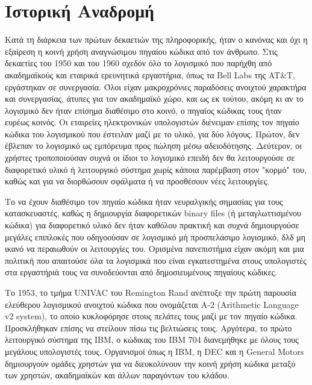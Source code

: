 \documentclass[a4paper, 11pt]{article}
\begin{document}
{\section{Ιστορική Αναδρομή}
Κατά τη διάρκεια των πρώτων δεκαετιών της πληροφορικής, ήταν ο κανόνας και όχι η εξαίρεση η κοινή χρήση αναγνώσιμου πηγαίου κώδικα από τον άνθρωπο. Στις δεκαετίες του 1950 και του 1960 σχεδόν όλο το λογισμικό που παρήχθη από ακαδημαϊκούς και εταιρικά ερευνητικά εργαστήρια, όπως τα \textlatin{Bell Labs} της  \textlatin{AT&T}, εργάστηκαν σε συνεργασία. Όλοι είχαν μακροχρόνιες παραδόσεις ανοιχτού χαρακτήρα και συνεργασίας, άτυπες για τον ακαδημαϊκό χώρο, και ως εκ τούτου, ακόμη κι αν το λογισμικό δεν ήταν επίσημα διαθέσιμο στο κοινό, ο πηγαίος κώδικας τους ήταν ευρέως κοινός. Οι εταιρείες ηλεκτρονικών υπολογιστών διένειμαν επίσης τον πηγαίο κώδικα του λογισμικού που έστειλαν μαζί με το υλικό, για δύο λόγους. Πρώτον, δεν έβλεπαν το λογισμικό ως εμπόρευμα προς πώληση μέσω αδειοδότησης. Δεύτερον, οι χρήστες τροποποιούσαν συχνά οι ίδιοι το λογισμικό επειδή δεν θα λειτουργούσε σε διαφορετικό υλικό ή λειτουργικό σύστημα χωρίς κάποια παρέμβαση στον "κορμό" του, καθώς και για να διορθώσουν σφάλματα ή να προσθέσουν νέες λειτουργίες.

Το να έχουν διαθέσιμο τον πηγαίο κώδικα ήταν νευραλγικής σημασίας για τους κατασκευαστές, καθώς η δημιουργία διαφορετικών \textlatin{binary files} (ή μεταγλωττισμένου κώδικα) για διαφορετικό υλικό δεν ήταν καθόλου πρακτική και 
συχνά δημιουργούσε μεγάλες επιπλοκές που οδηγοούσαν σε λογισμικό μή προσπελάσιμο λογισμικό, δλδ μη ικανό να περαιωθούν οι λειτουργίες του. Ορισμένα πανεπιστήμια είχαν ακόμη και μια πολιτική που απαιτούσε όλα τα λογισμικά που είναι εγκατεστημένα στους υπολογιστές στα εργαστήριά τους να συνοδεύονται από δημοσιευμένους πηγαίους κώδικες.

Το 1953, το τμήμα \textlatin{UNIVAC} του \textlatin{Remington Rand} ανέπτυξε την πρώτη παρουσία ελεύθερου λογισμικού ανοιχτού κώδικα που ονομάζεται  \textlatin{A-2 (Arithmetic Language v2 system)}, το οποίο κυκλοφόρησε στους πελάτες τους μαζί με τον πηγαίο κώδικα. Προσκλήθηκαν επίσης να στείλουν πίσω τις βελτιώσεις τους. Αργότερα, το πρώτο λειτουργικό σύστημα της  \textlatin{IBM}, ο κώδικας του  \textlatin{IBM 704} διανεμήθηκε με όλους τους μεγάλους υπολογιστές τους. Οργανισμοί όπως η \textlatin{IBM}, η \textlatin{DEC} και η \textlatin{General Motors} δημιουργούν ομάδες χρηστών για να διευκολύνουν την κοινή χρήση κώδικα μεταξύ των χρηστών, ακαδημαϊκών και άλλων
παραγόντων του κλάδου. 

}
\end{document}

